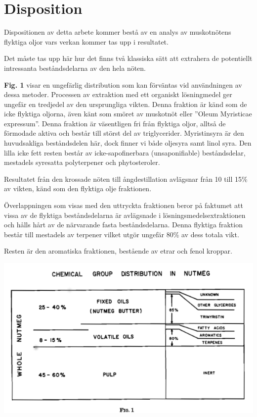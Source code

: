 \documentclass[a4paper,margin=3.25cm]{article}
\begin{document}
\pagebreak

\section{Disposition}

Dispositionen av detta arbete kommer bestå av en analys av muskotnötens flyktiga oljor
vars verkan kommer tas upp i resultatet.

Det måste tas upp här hur det finns två klassiska sätt att extrahera de potentiellt intressanta beståndsdelarna av den hela nöten.

\textbf{Fig. 1} \cite{shulgin1967chemistry} visar en ungefärlig distribution som kan förväntas vid användningen av dessa metoder. Processen av extraktion med ett organiskt lösningmedel ger ungefär en tredjedel av den ursprungliga vikten. Denna fraktion är känd som de icke flyktiga oljorna, även känt som smöret av muskotnöt eller ''Oleum Myristicae expressum''. Denna fraktion är väsentligen fri från flyktiga oljor, alltså de förmodade aktiva och består till störst del av triglycerider. Myristinsyra är den huvudsakliga beståndsdelen här, dock finner vi både oljesyra samt linol syra. Den lilla icke fett resten består av icke-sapofinerbara (unsaponifiable) beståndsdelar, mestadels syresatta polyterpener och phytosteroler. \cite{shulgin1967chemistry}

Resultatet från den krossade nöten till ångdestillation avlägsnar från 10 till 15\% av vikten, känd som den flyktiga olje fraktionen.

Överlappningen som visas med den uttryckta fraktionen beror på faktumet att vissa av de flyktiga beståndsdelarna är avlägsnade i lösningsmedelsextraktionen och hålls hårt av de närvarande fasta beståndsdelarna.
Denna flyktiga fraktion består till mestadels av terpener vilket utgör ungefär 80\% av dess totala vikt.

Resten är den aromatiska fraktionen, bestående av etrar och fenol kroppar.\cite{shulgin1967chemistry}


 \centerline{\includegraphics[scale=0.5]{Figure1}}
\end{document}
